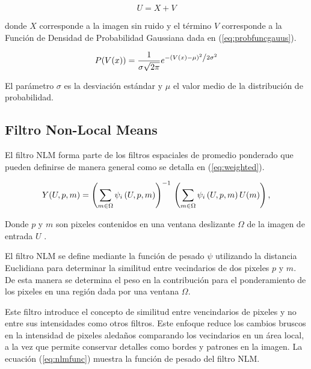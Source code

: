 \begin{equation}
\label{eq:modelruido}
U = X + V
\end{equation}

 donde $X$ corresponde a la imagen sin ruido y el t\'ermino $V$ corresponde a la Funci\'on de Densidad de Probabilidad Gaussiana dada en (\ref{eq:probfuncgauus}).

\begin{equation}
\label{eq:probfuncgauus}
P(V(x)) = \frac{1}{{\sigma \sqrt {2\pi } }}e^{{{ - \left( {V(x) - \mu } \right)^2 } \mathord{\left/ {\vphantom {{ - \left( {x - \mu } \right)^2 } {2\sigma ^2 }}} \right. \kern-\nulldelimiterspace} {2\sigma ^2 }}}
\end{equation}

El par\'ametro $\sigma$ es la desviaci\'on est\'andar  y $\mu$ el valor medio de la distribuci\'on de probabilidad.


\subsection{Filtro Non-Local Means}
\label{ch:marco_nlm}

El filtro NLM forma parte de los filtros espaciales de promedio ponderado que pueden definirse de manera general como se detalla en (\ref{eq:weighted}).

\begin{equation}
\label{eq:weighted}
Y(U,p,m)=\left(\sum_{m\in \Omega}\psi_{i}\left(U, p, m\right)\right)^{-1} \\ \left(\sum_{m\in \Omega}\psi_{i}\left(U, p, m\right)U(m)\right),
\end{equation}

Donde $p$ y $m$ son pixeles contenidos en una ventana deslizante $\Omega$ de la imagen de entrada $U$ \cite{calderon2015dewaff}.

El filtro NLM se define mediante la funci\'on de pesado $\psi$ utilizando la distancia Euclidiana para determinar la similitud entre vecindarios de dos pixeles $p$ y $m$. De esta manera se determina el peso en la contribuci\'on para el ponderamiento de los pixeles en una regi\'on dada por una ventana $\Omega$. 

Este filtro introduce el concepto de similitud entre vencindarios de pixeles y no entre sus intensidades como otros filtros. Este enfoque reduce los cambios bruscos en la intensidad de pixeles aleda\~nos comparando los vecindarios en un \'area local, a la vez que permite conservar detalles como bordes y patrones en la imagen\cite{calderon2015dewaff}. La ecuaci\'on (\ref{eq:nlmfunc}) muestra la funci\'on de pesado del filtro NLM.

